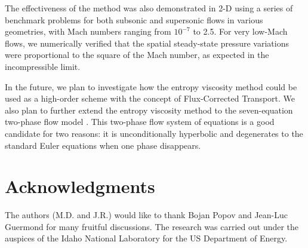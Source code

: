 \documentclass[review,10pt]{elsarticle}
\begin{document}
The effectiveness of the method was also demonstrated in 2-D using a series of benchmark problems
for both subsonic and supersonic flows in various geometries, with Mach numbers ranging from $10^{-7}$ to 
2.5. For very low-Mach flows, we numerically verified that the spatial steady-state pressure variations were proportional to 
the square of the Mach number, as expected in the incompressible limit.

In the future, we plan to investigate how the entropy viscosity method could be used as a high-order scheme with the concept of Flux-Corrected Transport. We also plan to further extend the entropy viscosity method to the seven-equation two-phase flow model \cite{SEM}. 
This two-phase flow system of equations is a good candidate for two reasons: it is unconditionally hyperbolic and degenerates to the standard Euler equations when one phase disappears.


\section*{Acknowledgments} 
The authors (M.D. and J.R.) would like to thank Bojan Popov and Jean-Luc Guermond for many fruitful discussions.  
The research was carried out under the auspices of the Idaho National Laboratory for the US Department of Energy.


\newpage
\appendix
\end{document}
